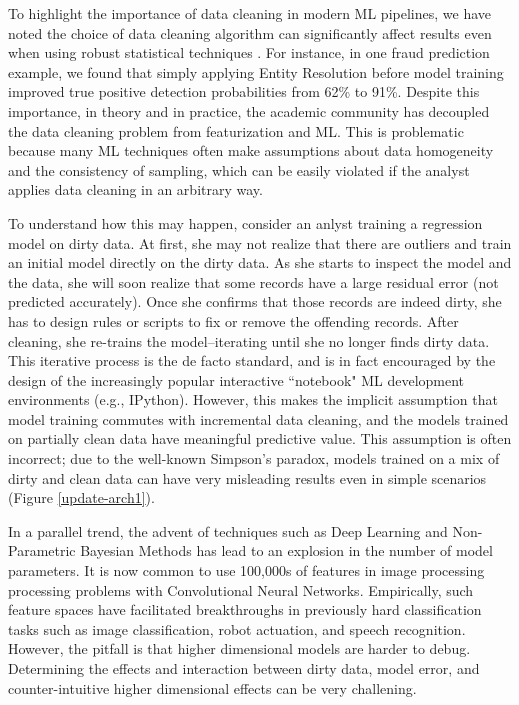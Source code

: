 To highlight the importance of data cleaning in modern ML pipelines, we have noted the choice of data cleaning algorithm can significantly affect results even when using robust statistical techniques \cite{activecleanarxiv, DBLP:conf/case/MahlerKLSMKPWFAG14}.
For instance, in one fraud prediction example, we found that simply applying Entity Resolution before model training improved true positive detection probabilities from 62\% to 91\%. 
Despite this importance, in theory and in practice, the academic community has decoupled the data cleaning problem from featurization and ML.
This is problematic because many ML techniques often make assumptions about data homogeneity and the consistency of sampling, which can be easily violated if the analyst applies data cleaning in an arbitrary way.

To understand how this may happen, consider an anlyst training a regression model on dirty data. At first, she may not realize that there are outliers and train an initial model directly on the dirty data. 
As she starts to inspect the model and the data, she will soon realize that some records have a large residual error (not predicted accurately). 
Once she confirms that those records are indeed dirty, she has to design rules or scripts to fix or remove the offending records. 
After cleaning, she re-trains the model--iterating until she no longer finds dirty data.
This iterative process is the de facto standard, and is in fact encouraged by the design of the increasingly popular interactive ``notebook" ML development environments (e.g., IPython).
However, this makes the implicit assumption that model training commutes with incremental data cleaning, and the models trained on partially clean data have meaningful predictive value.
This assumption is often incorrect; due to the well-known Simpson's paradox, models trained on a mix of dirty and clean data can have very misleading results even in simple scenarios (Figure \ref{update-arch1}).

In a parallel trend, the advent of techniques such as Deep Learning and Non-Parametric Bayesian Methods has lead to an explosion in the number of model parameters.
It is now common to use 100,000s of features in image processing processing problems with Convolutional Neural Networks.
Empirically, such feature spaces have facilitated breakthroughs in previously hard classification tasks such as image classification, robot actuation, and speech recognition.
However, the pitfall is that higher dimensional models are harder to debug.
Determining the effects and interaction between dirty data, model error, and counter-intuitive higher dimensional effects can be very challening.

